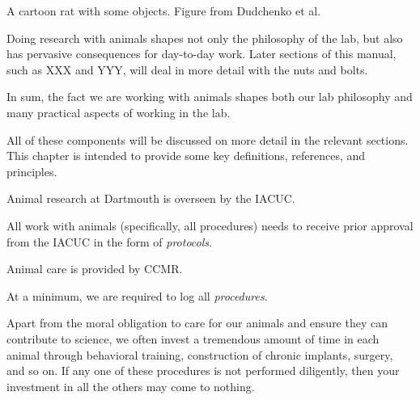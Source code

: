 \documentclass{tufte-book}
\begin{document}
\begin{marginfigure}
\caption{A cartoon rat with some objects. Figure from Dudchenko et al.}
\label{fig:rat-with-objects}
\end{marginfigure}

Doing research with animals shapes not only the philosophy of the lab,
but also has pervasive consequences for day-to-day work. Later
sections of this manual, such as XXX and YYY, will deal in more detail
with the nuts and bolts.

In sum, the fact we are working with animals shapes both our lab
philosophy and many practical aspects of working in the lab.

All of these components will be discussed on more detail in the
relevant sections. This chapter is intended to provide some key
definitions, references, and principles.

Animal research at Dartmouth is overseen by the IACUC.

All work with animals (specifically, all procedures) needs to receive
prior approval from the IACUC in the form of
{\it protocols}.

Animal care is provided by CCMR.

At a minimum, we are required to log all {\it
  procedures}.

Apart from the moral obligation to care for our animals and ensure
they can contribute to science, we often invest a tremendous amount of
time in each animal through behavioral training, construction of
chronic implants, surgery, and so on. If any one of these procedures
is not performed diligently, then your investment in all the others
may come to nothing.
\end{document}
